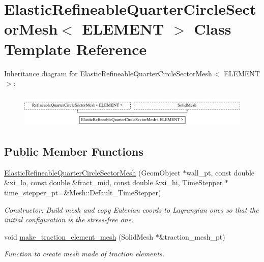 \hypertarget{classElasticRefineableQuarterCircleSectorMesh}{}\section{Elastic\+Refineable\+Quarter\+Circle\+Sector\+Mesh$<$ E\+L\+E\+M\+E\+NT $>$ Class Template Reference}
\label{classElasticRefineableQuarterCircleSectorMesh}
Inheritance diagram for Elastic\+Refineable\+Quarter\+Circle\+Sector\+Mesh$<$ E\+L\+E\+M\+E\+NT $>$\+:\begin{figure}[H]
\begin{center}
\leavevmode
\includegraphics[height=1.623188cm]{classElasticRefineableQuarterCircleSectorMesh}
\end{center}
\end{figure}
\subsection*{Public Member Functions}
\begin{DoxyCompactItemize}
\item 
\hyperlink{classElasticRefineableQuarterCircleSectorMesh_a123699deecd2a908a7a882a9d2a9f4dd}{Elastic\+Refineable\+Quarter\+Circle\+Sector\+Mesh} (Geom\+Object $\ast$wall\+\_\+pt, const double \&xi\+\_\+lo, const double \&fract\+\_\+mid, const double \&xi\+\_\+hi, Time\+Stepper $\ast$time\+\_\+stepper\+\_\+pt=\&Mesh\+::\+Default\+\_\+\+Time\+Stepper)
\begin{DoxyCompactList}\small\item\em Constructor\+: Build mesh and copy Eulerian coords to Lagrangian ones so that the initial configuration is the stress-\/free one. \end{DoxyCompactList}\item 
void \hyperlink{classElasticRefineableQuarterCircleSectorMesh_ad9734ea7aee2141079544bb782d3ace1}{make\+\_\+traction\+\_\+element\+\_\+mesh} (Solid\+Mesh $\ast$\&traction\+\_\+mesh\+\_\+pt)
\begin{DoxyCompactList}\small\item\em Function to create mesh made of traction elements. \end{DoxyCompactList}\end{DoxyCompactItemize}


